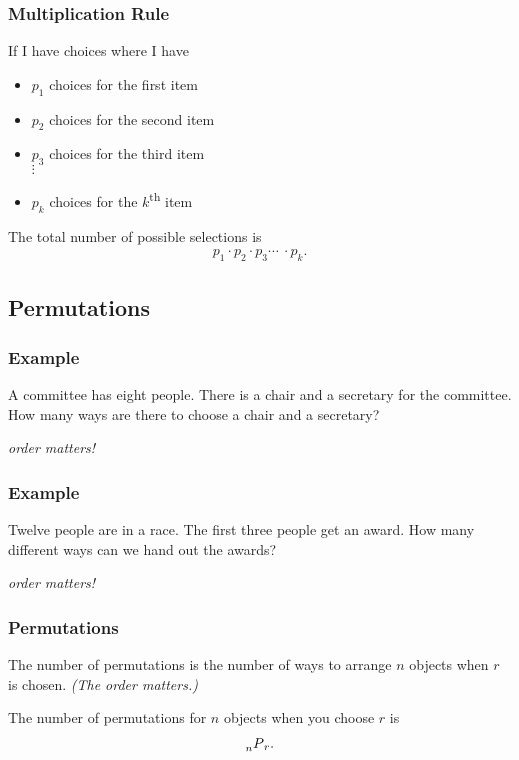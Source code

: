 \begin{frame}
  \frametitle{Multiplication Rule}

  \begin{definition}
    If I have choices where I have
    \begin{itemize}
    \item $p_1$ choices for the first item
    \item $p_2$ choices for the second item
    \item $p_3$ choices for the third item \\
      $\vdots$
    \item $p_k$ choices for the $k$\textsuperscript{th} item \\
    \end{itemize}

    The total number of possible selections is 
    \begin{eqnarray*}
      p_1 \cdot p_2 \cdot p_3 \cdots ~ \cdot p_k.
    \end{eqnarray*}

  \end{definition}

\end{frame}

\subsection{Permutations}

\begin{frame}
  \frametitle{Example}
  A committee has eight people. There is a chair and a secretary for
  the committee. How many ways are there to choose a chair and a
  secretary?

  \vfill

  \textit{ order matters!}

\end{frame}

\begin{frame}
  \frametitle{Example}
  Twelve people are in a race. The first three people get an
  award. How many different ways can we hand out the awards?

  \vfill

  \textit{ order matters!}
\end{frame}


\begin{frame}
  \frametitle{Permutations}
  \begin{definition}[Permutations]
    The number of permutations is the number of ways to arrange $n$
    objects when $r$ is chosen. \textit{(The order matters.)}
  \end{definition}

  {
    \begin{definition}[Notation]
      The number of permutations for $n$ objects when you choose $r$
      is 
      \begin{eqnarray*}
        \prescript{~}{n}{P}_r.
      \end{eqnarray*}
    \end{definition}
  }

\end{frame}

